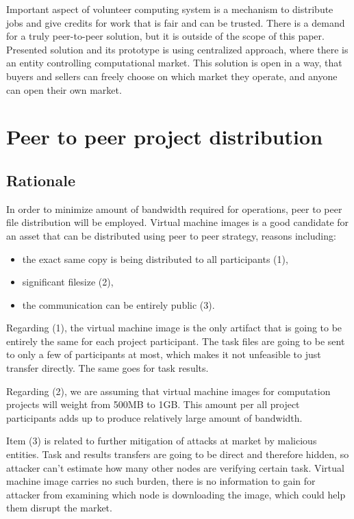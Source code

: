 Important aspect of volunteer computing system is a mechanism to distribute jobs and give credits for work that is fair and can be trusted. There is a demand for a truly peer-to-peer solution, but it is outside of the scope of this paper. Presented solution and its prototype is using centralized approach, where there is an entity controlling computational market. This solution is open in a way, that buyers and sellers can freely choose on which market they operate, and anyone can open their own market.

\begin{comment}
In similar way the bitcoin pooled mining works. Bitcoin miners connect into centralized pool and share their rewards. The pool itself is centralized, but everyone is free to choose their pool, or even open one themselves.
\end{comment}

\section{Peer to peer project distribution}
\label{sec:p2p_projects}

\subsection{Rationale}

In order to minimize amount of bandwidth required for operations, peer to peer file distribution will be employed. Virtual machine images is a good candidate for an asset that can be distributed using peer to peer strategy, reasons including:
\begin{itemize}
	\item the exact same copy is being distributed to all participants (1),
	\item significant filesize (2),
	\item the communication can be entirely public (3).
\end{itemize}

Regarding (1), the virtual machine image is the only artifact that is going to be entirely the same for each project participant. The task files are going to be sent to only a few of participants at most, which makes it not unfeasible to just transfer directly. The same goes for task results.

Regarding (2), we are assuming that virtual machine images for computation projects will weight from 500MB to 1GB. This amount per all project participants adds up to produce relatively large amount of bandwidth.

Item (3) is related to further mitigation of attacks at market by malicious entities. Task and results transfers are going to be direct and therefore hidden, so attacker can't estimate how many other nodes are verifying certain task. Virtual machine image carries no such burden, there is no information to gain for attacker from examining which node is downloading the image, which could help them disrupt the market.